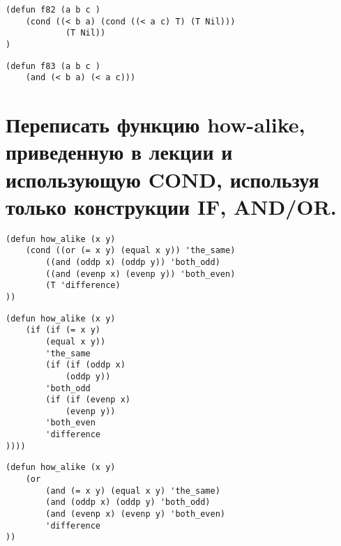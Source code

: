 \documentclass[a4paper, 14pt, unknownkeysallowed]{extreport}
\begin{document}
\begin{lstlisting}
(defun f82 (a b c )
	(cond ((< b a) (cond ((< a c) T) (T Nil))) 
			(T Nil))
)
\end{lstlisting} 

\begin{lstlisting}
(defun f83 (a b c )
	(and (< b a) (< a c)))
\end{lstlisting} 

\section{Переписать функцию how-alike, приведенную в лекции и использующую COND, используя только конструкции IF, AND/OR.}

\begin{lstlisting}
(defun how_alike (x y)
	(cond ((or (= x y) (equal x y)) 'the_same)
		((and (oddp x) (oddp y)) 'both_odd)
		((and (evenp x) (evenp y)) 'both_even)
		(T 'difference)
))
\end{lstlisting} 

\begin{lstlisting}
(defun how_alike (x y)
	(if (if (= x y)
		(equal x y))
		'the_same
		(if (if (oddp x)
			(oddp y))
		'both_odd
		(if (if (evenp x)
			(evenp y))
		'both_even
		'difference
))))
\end{lstlisting} 

\begin{lstlisting}
(defun how_alike (x y)
	(or
		(and (= x y) (equal x y) 'the_same)
		(and (oddp x) (oddp y) 'both_odd)
		(and (evenp x) (evenp y) 'both_even)
		'difference
))
\end{lstlisting} 
\end{document}
